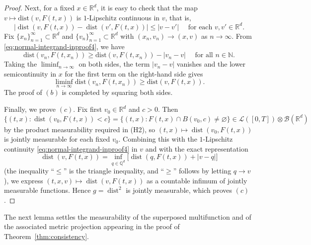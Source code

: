\documentclass[11pt]{elsarticle}
\theoremstyle{definition}
\theoremstyle{remark}
\numberwithin{equation}{section}
\def\dist{\operatorname{dist}}
\begin{document}
\begin{proof}
		Next, for a fixed $x\in\mathbb{R}^d$, it is easy to check that the map $v \mapsto \text{dist}(v, F(t, x))$ is $1$-Lipschitz continuous in $v$, that is,
		\begin{equation}\label{eq:normal-integrand-inproof4}
			|\dist(v, F(t,x)) - \dist(v', F(t,x))| \le |v - v'|
			\quad \text{ for each } v,v'\in\mathbb{R}^d.
		\end{equation}
		Fix $\{x_n\}_{n=1}^{\infty}\subset\mathbb{R}^d$
		and $\{v_n\}_{n=1}^{\infty}\subset\mathbb{R}^d$
		with $(x_n, v_n) \rightarrow (x, v)$ as $n \rightarrow \infty.$ From \eqref{eq:normal-integrand-inproof4}, we have
		\begin{equation}
			\text{dist}(v_n, F(t, x_n)) \ge \text{dist}(v, F(t, x_n)) - |v_n - v| \quad \text{ for all } n\in\mathbb{N}.
		\end{equation}
		Taking the $\liminf_{n \rightarrow \infty}$ on both sides, the term $|v_n - v|$ vanishes and the lower semicontinuity in $x$ for the first term on the right-hand side gives
		\begin{equation}
			\liminf_{n \rightarrow \infty} \text{dist}(v_n, F(t, x_n)) \ge \text{dist}(v, F(t, x)).
		\end{equation}
		The proof of $(b)$ is completed by squaring both sides.
		
		Finally, we prove $(c)$. Fix first $v_0\in\mathbb{R}^d$ and
		$c>0$. Then
		\[
		\bigl\{(t,x):\dist(v_0,F(t,x))<c\bigr\}
		=
		\bigl\{(t,x):F(t,x)\cap B(v_0,c)\neq\varnothing\bigr\}
		\in
		\mathcal{L}([0,T])\otimes\mathcal{B}(\mathbb{R}^d)
		\]
		by the product measurability required in \textup{(H2)}, so
		$(t,x)\mapsto\dist(v_0,F(t,x))$ is jointly measurable for each fixed
		$v_0$. Combining this with the $1$-Lipschitz continuity
		\eqref{eq:normal-integrand-inproof4} in $v$ and with the exact
		representation
		\[
		\dist(v,F(t,x))
		=
		\inf_{q\in\mathbb{Q}^d}
		\bigl[\dist(q,F(t,x))+|v-q|\bigr]
		\]
		(the inequality ``$\le$'' is the triangle inequality, and
		``$\ge$'' follows by letting $q\to v$), we express
		$(t,x,v)\mapsto\dist(v,F(t,x))$ as a countable infimum of jointly
		measurable functions. Hence $g=\dist^2$ is jointly measurable, which
		proves $(c)$.
	\end{proof}
	
	
	The next lemma settles the measurability of the superposed
	multifunction and of the associated metric projection appearing in the
	proof of Theorem~\ref{thm:consistency}.
	
\end{document}
